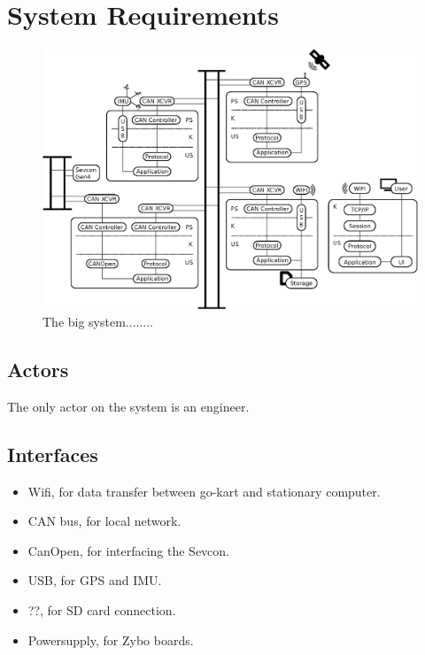 \section{System Requirements} %
\label{sec:system_requirements}



\begin{figure}[!h]
	\centering
	\includegraphics[angle=90,width=\textwidth]{graphics/analysis_complex.eps}
	\caption{The big system........}
	\label{fig:complete_system}
\end{figure}



\subsection{Actors}
The only actor on the system is an engineer.

\subsection{Interfaces}
\begin{itemize}
\item Wifi, for data transfer between go-kart and stationary computer.
\item CAN bus, for local network.
\item CanOpen, for interfacing the Sevcon.
\item USB, for GPS and IMU.
\item ??, for SD card connection.
\item Powersupply, for Zybo boards.
\end{itemize}


